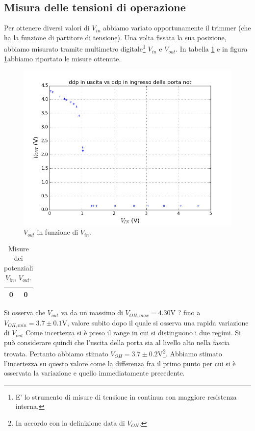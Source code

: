 \documentclass[10pt,a4paper]{article}
\begin{document}
\subsection{Misura delle tensioni di operazione}
Per ottenere diversi valori di $V_{in}$ abbiamo variato opportunamente il trimmer (che ha la funzione di partitore di tensione). Una volta fissata la sua posizione, abbiamo misurato tramite multimetro digitale\footnote{E' lo strumento di misure di tensione in continua con maggiore resistenza interna.} $V_{in}$ e $V_{out}$.
In tabella \ref{tab:vinvout} e in figura \ref{fig:vinvout}abbiamo riportato le misure ottenute.
\begin{figure}
\centering
\includegraphics[scale=0.9]{vinvout.png}
\caption{$V_{out}$ in funzione di $V_{in}$.\label{fig:vinvout}}
\end{figure}

\begin{table}
\centering
\begin{tabular}{|c|c|}
\hline
0 & 0\\
\hline
\end{tabular}
\caption{Misure dei potenziali $V_{in}$, $V_{out}$.\label{tab:vinvout}}
\end{table}
Si osserva che $V_{out}$ va da un massimo di $V_{OH,max}=4.30$V \PM? fino a 
$V_{OH,min}=3.7\pm 0.1$V, valore subito dopo il quale si osserva una rapida variazione di $V_{out}$%
Come incertezza si è preso il range in cui si distinguono i due regimi.
Si può considerare quindi che l'uscita della porta sia al livello alto nella fascia trovata. Pertanto abbiamo stimato $V_{OH}=3.7\pm0.2$V\footnote{In accordo con la definizione data di $V_{OH}$.}. Abbiamo stimato l'incertezza su questo valore come la differenza fra il primo punto per cui si è osservata la variazione e quello immediatamente precedente.
\end{document}
